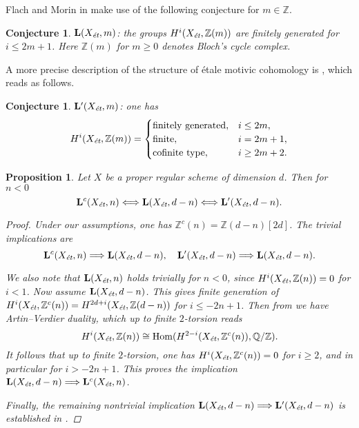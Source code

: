 \documentclass[draft,leqno,12pt]{article}
\theoremstyle{plain}
\newtheorem{proposition}[theorem]{\indent\sc Proposition}
\newtheorem{conjecture}[theorem]{\indent\sc Conjecture}
\theoremstyle{definition}
\DeclareMathOperator{\Hom}{Hom}
\newcommand{\ZZ}{\mathbb{Z}}
\newcommand{\QQ}{\mathbb{Q}}
\newcommand{\et}{\text{\it \'{e}t}}
\begin{document}
\vspace{1em}

Flach and Morin in \cite{Flach-Morin-2018} make use of the following conjecture
for $m \in \ZZ$.

\begin{conjecture}
  $\mathbf{L} (X_\et, m)$: the groups $H^i (X_\et, \ZZ (m))$ are finitely
  generated for $i \le 2m+1$. Here $\ZZ (m)$ for $m \ge 0$ denotes Bloch's cycle
  complex.
\end{conjecture}

A more precise description of the structure of \'{e}tale motivic cohomology is
\cite[Conjecture~4.12]{Geisser-2017}, which reads as follows.

\begin{conjecture}
  $\mathbf{L}' (X_\et, m)$: one has
  \[ H^i (X_\et, \ZZ (m)) = \begin{cases}
      \text{finitely generated}, & i \le 2m, \\
      \text{finite}, & i = 2m + 1, \\
      \text{cofinite type}, & i \ge 2m + 2.
    \end{cases} \]
\end{conjecture}

\begin{proposition}
  \label{prop:Lc-Xet-n-vs-L-Xet-d-n}
  Let $X$ be a proper regular scheme of dimension $d$. Then for $n < 0$
  \[ \mathbf{L}^c (X_\et, n) \Longleftrightarrow
    \mathbf{L} (X_\et, d-n) \Longleftrightarrow
    \mathbf{L}' (X_\et, d-n). \]

  \begin{proof}
    Under our assumptions, one has $\ZZ^c (n) = \ZZ (d-n) [2d]$. The trivial
    implications are
    \[ \mathbf{L}^c (X_\et, n) \Longrightarrow \mathbf{L} (X_\et, d-n), \quad
      \mathbf{L}' (X_\et, d-n) \Longrightarrow \mathbf{L} (X_\et, d-n). \]

    We also note that $\mathbf{L} (X_\et, n)$ holds trivially for $n < 0$, since
    $H^i (X_\et, \ZZ (n)) = 0$ for $i < 1$.
    Now assume $\mathbf{L} (X_\et, d-n)$. This gives finite generation of
    $H^i (X_\et, \ZZ^c (n)) = H^{2d+i} (X_\et, \ZZ (d-n))$ for $i \le -2n + 1$.
    Then from \cite[Proposition~3.4]{Flach-Morin-2018} we have Artin--Verdier
    duality, which up to finite $2$-torsion reads
    $$H^i (X_\et, \ZZ (n)) \cong \Hom (H^{2-i} (X_\et, \ZZ^c (n)), \QQ/\ZZ).$$
    It follows that up to finite $2$-torsion, one has
    $H^i (X_\et, \ZZ^c (n)) = 0$ for $i \ge 2$, and in particular for
    $i > -2n + 1$. This proves the implication
    $\mathbf{L} (X_\et, d-n) \Longrightarrow \mathbf{L}^c (X_\et, n)$.

    Finally, the remaining nontrivial implication
    $\mathbf{L} (X_\et, d-n) \Longrightarrow \mathbf{L}' (X_\et, d-n)$ is
    established in \cite[Proposition~3.4]{Flach-Morin-2018}.
  \end{proof}
\end{proposition}
\end{document}
